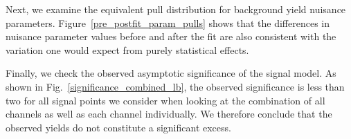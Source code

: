 


Next, we examine the equivalent pull distribution for background yield nuisance parameters. Figure~\ref{pre_postfit_param_pulls} shows that the differences in nuisance parameter values before and after the fit are also consistent with the variation one would expect from purely statistical effects.



Finally, we check the observed asymptotic significance of the \stoptolb signal model. As shown in Fig.~\ref{significance_combined_lb}, the observed significance is less than two for all signal points we consider when looking at the combination of all channels as well as each channel individually. We therefore conclude that the observed yields do not constitute a significant excess.



\pagebreak